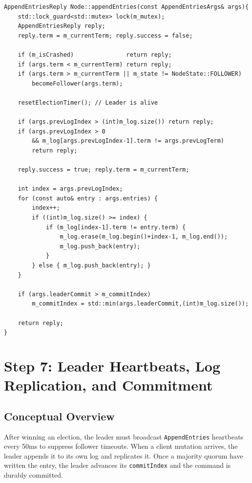 \documentclass[11pt, a4paper]{article}
\begin{document}
\begin{lstlisting}[style=cppstyle, caption={Node.cpp --- appendEntries()}]
AppendEntriesReply Node::appendEntries(const AppendEntriesArgs& args){
    std::lock_guard<std::mutex> lock(m_mutex);
    AppendEntriesReply reply;
    reply.term = m_currentTerm; reply.success = false;

    if (m_isCrashed)               return reply;
    if (args.term < m_currentTerm) return reply;
    if (args.term > m_currentTerm || m_state != NodeState::FOLLOWER)
        becomeFollower(args.term);

    resetElectionTimer(); // Leader is alive

    if (args.prevLogIndex > (int)m_log.size()) return reply;
    if (args.prevLogIndex > 0
        && m_log[args.prevLogIndex-1].term != args.prevLogTerm)
        return reply;

    reply.success = true; reply.term = m_currentTerm;

    int index = args.prevLogIndex;
    for (const auto& entry : args.entries) {
        index++;
        if ((int)m_log.size() >= index) {
            if (m_log[index-1].term != entry.term) {
                m_log.erase(m_log.begin()+index-1, m_log.end());
                m_log.push_back(entry);
            }
        } else { m_log.push_back(entry); }
    }

    if (args.leaderCommit > m_commitIndex)
        m_commitIndex = std::min(args.leaderCommit,(int)m_log.size());

    return reply;
}
\end{lstlisting}

\newpage

\section{Step 7: Leader Heartbeats, Log Replication, and Commitment}

\subsection{Conceptual Overview}
After winning an election, the leader must broadcast \texttt{AppendEntries}
heartbeats every 50ms to suppress follower timeouts. When a client mutation
arrives, the leader appends it to its own log and replicates it. Once a
majority quorum have written the entry, the leader advances its
\texttt{commitIndex} and the command is durably committed.
\end{document}
